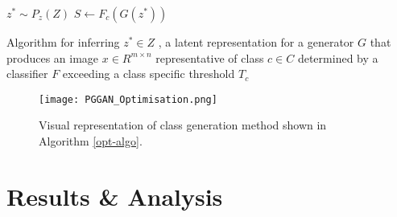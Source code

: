 \documentclass{article}
\begin{document}
\begin{algorithm}[H]
\label{opt-algo}
\SetAlgoLined
$z^* \sim P_z(Z)$ 
$S \leftarrow F_c(G(z^*))$\;
 \caption{Algorithm for inferring $z^* \in Z$ , a latent representation for a generator $G$ that produces an image $x \in R^{m \times n}$ representative of class $c \in C$ determined by a classifier $F$ exceeding a class specific threshold $T_c$}
\end{algorithm}

\begin{figure}[!htb]
    \centering
    \texttt{[image: PGGAN\_Optimisation.png]}
    \caption{Visual representation of class generation method shown in Algorithm \ref{opt-algo}. }
    \label{fig:class-optim}
\end{figure}

\section{Results \& Analysis}
\label{sec:analysis}
\end{document}
